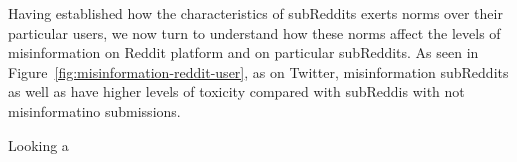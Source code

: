 Having established how the characteristics of subReddits exerts norms over their particular users, we now turn to understand how these norms affect the levels of misinformation on Reddit platform and on particular subReddits. 
As seen in Figure~\ref{fig:misinformation-reddit-user}, as on Twitter, misinformation subReddits as well as have higher levels of toxicity compared with subReddis with not misinformatino submissions. 

Looking a





